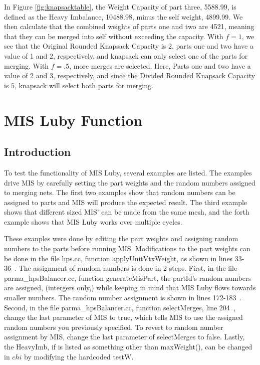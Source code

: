 \documentclass[a4paper]{article}
\begin{document}

In Figure \ref{fig:knapsacktable}, the Weight Capacity of part three, 5588.99, is defined as the Heavy Imbalance, 10488.98, minus the self weight, 4899.99. We then calculate that the combined weights of parts one and two are 4521, meaning that they can be merged into self without exceeding the capacity. 
With $f=1$, we see that the Original Rounded Knapsack Capacity is 2, parts one and two have a value of 1 and 2, respectively, and knapsack can only select one of the parts for merging. 
With $f=.5$, more merges are selected. Here, Parts one and two have a value of 2 and 3, respectively, and since the Divided Rounded Knapsack Capacity is 5, knapsack will select both parts for merging.

\section{MIS Luby Function}
\label{sec:misluby}

\subsection{Introduction}

To test the functionality of MIS Luby, several examples are listed. The examples drive MIS by carefully setting the part weights and the random numbers assigned to merging nets.  The first two examples show that random numbers can be assigned to parts and MIS will produce the expected result. The third example shows that different sized MIS' can be made from the same mesh, and the forth example shows that MIS Luby works over multiple cycles.

These exanples were done by editing the part weights and assigning random numbers to the parts before running MIS. Modifications to the part weights can be done in the file hps.cc, function applyUnitVtxWeight, as shown in lines 33-36~\cite{scorecGH}. The assignment of random numbers is done in 2 steps. First, in the file parma\_hpsBalancer.cc, function generateMisPart, the partId's random numbers are assigned, (intergers only,) while keeping in mind that MIS Luby flows towards smaller numbers. The random number assignment is shown  in lines 172-183~\cite{scorecGH}. Second, in the file parma\_hpsBalancer.cc, function selectMerges, line 204~\cite{scorecGH}, change the last parameter of MIS to true, which tells MIS to use the assigned random numbers you previously specified. To revert to random number assignment by MIS, change the last parameter of selectMerges to false. Lastly, the HeavyImb, if is listed as something other than maxWeight(), can be changed in $chi$ by modifying the hardcoded testW.
\end{document}

